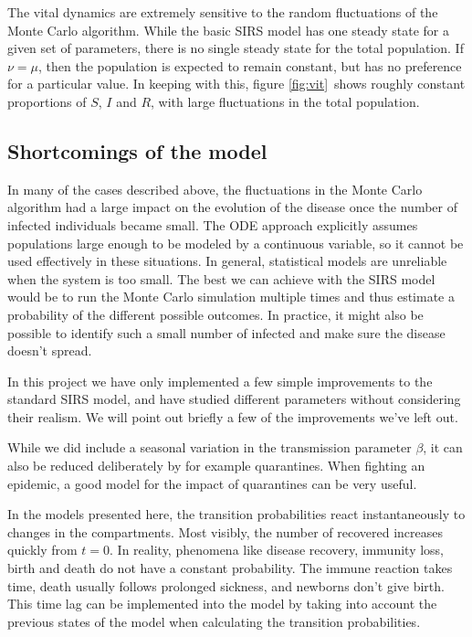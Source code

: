 \documentclass[a4paper,10pt,twocolumn]{article}
\begin{document}
The vital dynamics are extremely sensitive to the random fluctuations of the Monte Carlo algorithm. While the basic SIRS model has one steady state for a given set of parameters, there is no single steady state for the total population. If $\nu=\mu$, then the population is expected to remain constant, but has no preference for a particular value. 
In keeping with this, figure \ref{fig:vit} shows roughly constant proportions of $S$, $I$ and $R$, with large fluctuations in the total population.  



  
\subsection{Shortcomings of the model}

In many of the cases described above, the fluctuations in the Monte Carlo algorithm had a large impact on the evolution of the disease once the number of infected individuals became small. 
The ODE approach explicitly assumes populations large enough to be modeled by a continuous variable, so it cannot be used effectively in these situations. In general, statistical models are unreliable when the system is too small.
The best we can achieve with the SIRS model would be to run the Monte Carlo simulation multiple times and thus estimate a probability of the different possible outcomes. 
In practice, it might also be possible to identify such a small number of infected and make sure the disease doesn't spread.


In this project we have only implemented a few simple improvements to the standard SIRS model, and have studied different parameters without considering their realism. We will point out briefly a few of the improvements we've left out.

While we did include a seasonal variation in the transmission parameter $\beta$, it can also be reduced deliberately by for example quarantines. When fighting an epidemic, a good model for the impact of quarantines can be very useful.

In the models presented here, the transition probabilities react instantaneously to changes in the compartments.%
Most visibly, the  number of recovered increases quickly from $t=0$. In reality, phenomena like disease recovery, immunity loss, birth and death do not have a constant probability. The immune reaction takes time, death usually follows prolonged sickness, and newborns don't give birth. 
This time lag can be implemented into the model by taking into account the previous states of the model when calculating the transition probabilities.      
\end{document}
